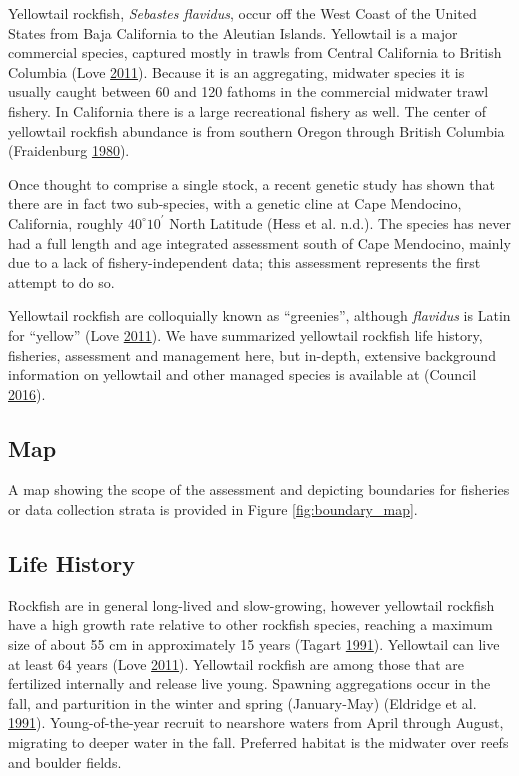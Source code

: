 \documentclass[12pt,]{article}
\begin{document}
Yellowtail rockfish, \emph{Sebastes flavidus}, occur off the West Coast
of the United States from Baja California to the Aleutian Islands.
Yellowtail is a major commercial species, captured mostly in trawls from
Central California to British Columbia (Love
\protect\hyperlink{ref-Love2011}{2011}). Because it is an aggregating,
midwater species it is usually caught between 60 and 120 fathoms in the
commercial midwater trawl fishery. In California there is a large
recreational fishery as well. The center of yellowtail rockfish
abundance is from southern Oregon through British Columbia (Fraidenburg
\protect\hyperlink{ref-Fraidenburg1980}{1980}).

Once thought to comprise a single stock, a recent genetic study has
shown that there are in fact two sub-species, with a genetic cline at
Cape Mendocino, California, roughly \(40^\circ 10^\prime\) North
Latitude (Hess et al. n.d.). The species has never had a full length and
age integrated assessment south of Cape Mendocino, mainly due to a lack
of fishery-independent data; this assessment represents the first
attempt to do so.

Yellowtail rockfish are colloquially known as ``greenies'', although
\emph{flavidus} is Latin for ``yellow'' (Love
\protect\hyperlink{ref-Love2011}{2011}). We have summarized yellowtail
rockfish life history, fisheries, assessment and management here, but
in-depth, extensive background information on yellowtail and other
managed species is available at (Council
\protect\hyperlink{ref-PFMC2016}{2016}).

\subsection{Map}\label{map}

A map showing the scope of the assessment and depicting boundaries for
fisheries or data collection strata is provided in Figure
\ref{fig:boundary_map}.

\subsection{Life History}\label{life-history}

Rockfish are in general long-lived and slow-growing, however yellowtail
rockfish have a high growth rate relative to other rockfish species,
reaching a maximum size of about 55 cm in approximately 15 years (Tagart
\protect\hyperlink{ref-Tagart1991}{1991}). Yellowtail can live at least
64 years (Love \protect\hyperlink{ref-Love2011}{2011}). Yellowtail
rockfish are among those that are fertilized internally and release live
young. Spawning aggregations occur in the fall, and parturition in the
winter and spring (January-May) (Eldridge et al.
\protect\hyperlink{ref-Eldridge1991}{1991}). Young-of-the-year recruit
to nearshore waters from April through August, migrating to deeper water
in the fall. Preferred habitat is the midwater over reefs and boulder
fields.
\end{document}
